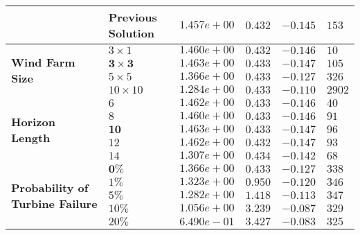\begin{tabular}{l|lllll}
&                                                        Previous Solution        & $1.457e+00$                            & $0.432$                            & $-0.145$                               & $153$ \\ \hline 
\multirow{4}{*}{\textbf{Wind Farm Size}}       & $3 \times 1$           & $1.460e+00$                         & $0.432$                         & $-0.146$                            & $10$ \\ 
&                                                        $\bm{3 \times 3}$    & $1.463e+00$                         & $0.433$                         & $-0.147$                            & $105$ \\ 
&                                                        $5 \times 5$            & $1.366e+00$                        & $0.433$                        & $-0.127$                           & $326$ \\ 
&                                                        $10 \times 10$          & $1.284e+00$                       & $0.433$                       & $-0.110$                          & $2902$ \\ \hline 
\multirow{5}{*}{\textbf{Horizon Length}}       & $6$                     & $1.462e+00$                       & $0.433$                       & $-0.146$                          & $40$ \\ 
&                                                        $8$                      & $1.460e+00$                       & $0.433$                       & $-0.146$                          & $91$ \\ 
&                                                        $\bm{10}$             & $1.463e+00$                      & $0.433$                      & $-0.147$                         & $96$ \\ 
&                                                        $12$                     & $1.462e+00$                      & $0.432$                      & $-0.147$                         & $93$ \\ 
&                                                        $14$                     & $1.307e+00$                      & $0.434$                      & $-0.142$                         & $68$ \\ \hline 
\multirow{5}{*}{\textbf{Probability of Turbine Failure}} & $\bm{0\%}$ & $1.366e+00$ & $0.433$ & $-0.127$    & $338$ \\ 
&                                                                  $1\%$          & $1.323e+00$ & $0.950$ & $-0.120$    & $346$ \\ 
&                                                                  $5\%$          & $1.282e+00$ & $1.418$ & $-0.113$    & $347$ \\ 
&                                                                  $10\%$         & $1.056e+00$ & $3.239$ & $-0.087$    & $329$ \\ 
&                                                                  $20\%$         & $6.490e-01$ & $3.427$ & $-0.083$    & $325$ 
\end{tabular}